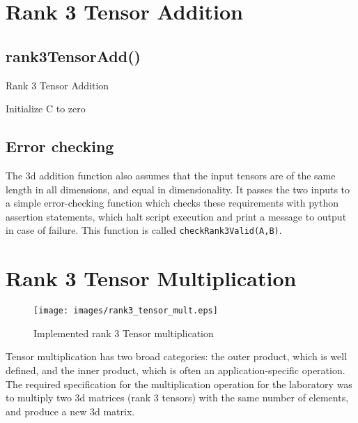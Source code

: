 \documentclass[10 pt, conference]{cssconf}
\begin{document}
\section{Rank 3 Tensor Addition}

\subsection{rank3TensorAdd()}
\begin{algorithm}[ht]
\caption{Rank 3 Tensor Addition}\label{pc:rank3_add}
    	 \SetAlgoLined
	Initialize C to zero\;
\end{algorithm}

\subsection{Error checking}
The 3d addition function also assumes that the input tensors are of the same length in all dimensions, and equal in dimensionality. It passes the two inputs to a simple error-checking function which checks these requirements with python assertion statements, which halt script execution and print a message to output in case of failure. This function is called \verb|checkRank3Valid(A,B)|.
\section{Rank 3 Tensor Multiplication}

\begin{figure}[ht] \centering 
    \vspace*{-5pt}
    \small{\texttt{[image: images/rank3\_tensor\_mult.eps]}}
    \small\caption{Implemented rank 3 Tensor multiplication}
    \label{fig:tensor_product} 
\end{figure}%

Tensor multiplication has two broad categories: the outer product, which is well defined, and the inner product, which  is often an application-specific operation. The required specification for the multiplication operation for the laboratory was to multiply two 3d matrices (rank 3 tensors) with the same number of elements, and produce a new 3d matrix.
\end{document}
